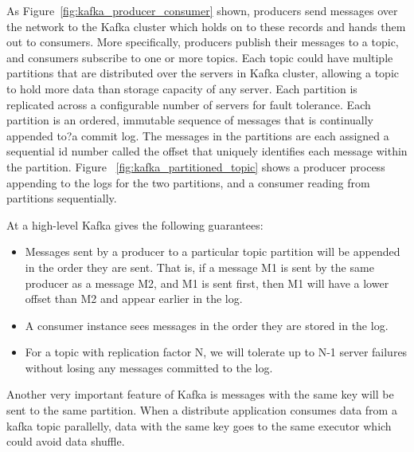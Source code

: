 As Figure~\ref{fig:kafka_producer_consumer} shown, producers send messages over the network to the Kafka cluster which holds on to these records and hands them out to consumers. More specifically, producers publish their messages to a topic, and consumers subscribe to one or more topics. Each topic could have multiple partitions that are distributed over the servers in Kafka cluster, allowing a topic to hold more data than storage capacity of any server. Each partition is replicated across a configurable number of servers for fault tolerance. Each partition is an ordered, immutable sequence of messages that is continually appended to?a commit log. The messages in the partitions are each assigned a sequential id number called the offset that uniquely identifies each message within the partition.  Figure ~\ref{fig:kafka_partitioned_topic} shows a producer process appending to the logs for the two partitions, and a consumer reading from partitions sequentially. 

At a high-level Kafka gives the following guarantees: \cite{Kafka}
\begin{itemize}
  \item Messages sent by a producer to a particular topic partition will be appended in the order they are sent. That is, if a message M1 is sent by the same producer as a message M2, and M1 is sent first, then M1 will have a lower offset than M2 and appear earlier in the log. 
  \item A consumer instance sees messages in the order they are stored in the log.
  \item For a topic with replication factor N, we will tolerate up to N-1 server failures without losing any messages committed to the log.
\end{itemize}


Another very important feature of Kafka is messages with the same key will be sent to the same partition. When a distribute application consumes data from a kafka topic parallelly,  data with the same key goes to the same executor which could avoid data shuffle.


